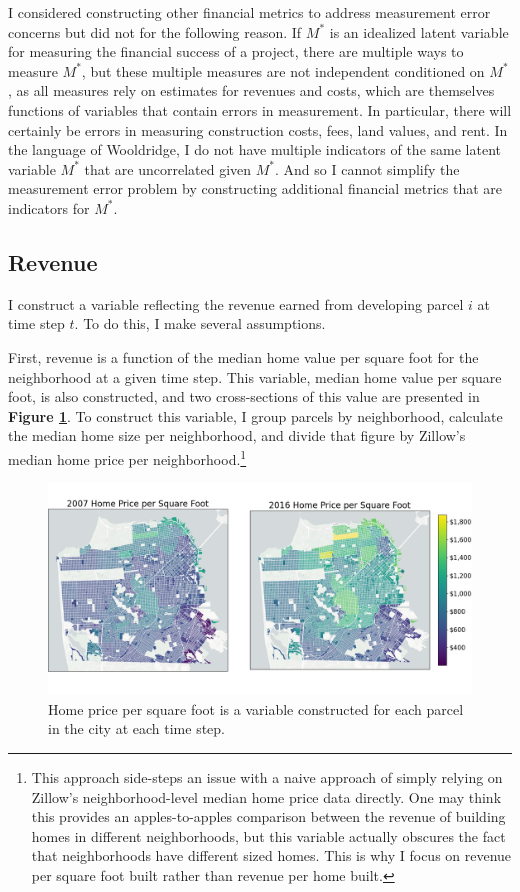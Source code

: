 \documentclass[a4paper,12pt]{article}
\begin{document}
I considered constructing other financial metrics to address measurement error concerns but did not for the following reason. If $M^{*}$ is an idealized latent variable for measuring the financial success of a project, there are multiple ways to measure $M^{*}$, but these multiple measures are not independent conditioned on $M^{*}$, as all measures rely on estimates for revenues and costs, which are themselves functions of variables that contain errors in measurement.\cite{schennach2016recent}\cite{schennach2020mismeasured} In particular, there will certainly be errors in measuring construction costs, fees, land values, and rent. In the language of Wooldridge, I do not have multiple indicators of the same latent variable $M^*$ that are uncorrelated given $M^*$.\cite{wooldridge2010econometric} And so I cannot simplify the measurement error problem by constructing additional financial metrics that are indicators for $M^*$.

\subsection{Revenue}
\label{rev.sec}

I construct a variable reflecting the revenue earned from developing parcel $i$ at time step $t$. To do this, I make several assumptions. 

First, revenue is a function of the median home value per square foot for the neighborhood at a given time step. This variable, median home value per square foot, is also constructed, and two cross-sections of this value are presented in \textbf{Figure \ref{fig:combined_sqft_price}}. To construct this variable, I group parcels by neighborhood, calculate the median home size per neighborhood, and divide that figure by Zillow's median home price per neighborhood.\footnote{This approach side-steps an issue with a naive approach of simply relying on Zillow's neighborhood-level median home price data directly. One may think this provides an apples-to-apples comparison between the revenue of building homes in different neighborhoods, but this variable actually obscures the fact that neighborhoods have different sized homes. This is why I focus on revenue per square foot built rather than revenue per home built.}
 
\begin{figure}[hbt]
    \includegraphics[scale=.45]{figures/combined_sqft_price.png}
    \caption{Home price per square foot is a variable constructed for each parcel in the city at each time step.}
    \label{fig:combined_sqft_price}
\end{figure}
\end{document}

